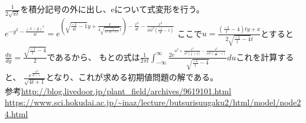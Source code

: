 \documentclass[11pt]{jsarticle}
\begin{document}
$\frac{1}{2\sqrt{\pi t}}$を積分記号の外に出し、eについて式変形を行う。$e^{-y^2 - \frac{(x-y)^2}{4t}} = e^{(\sqrt{\frac{-1}{4t} - 1}y + \frac{x}{4\sqrt{\frac{-1}{4(4t - 1)}}t}) - \frac{x^2}{4t} - \frac{x^2}{16t^2(\frac{-1}{4t} - 1)}}$
ここで$u = \frac{(\frac{-1}{t} - 4)ty + x}{2\sqrt{\frac{-1}{t} - 4}t}$とすると$\frac{du}{dy} = \frac{\sqrt{\frac{-1}{t} - 4}}{2}$であるから、
もとの式は$\frac{1}{2\pi t}\int_{-\infty}^{\infty}\frac{2e^{u^2 + \frac{x^2}{4t^2(\frac{1}{t} + 4)} - \frac{x^2}{16t^2(\frac{-1}{4t} - 1)}}}{\sqrt{\frac{-1}{t} - 4}}du$これを計算すると、
$\frac{e^{\frac{-x^2}{4t + 1}}}{\sqrt{4t + 1}}$となり、これが求める初期値問題の解である。\\
    参考\url{http://blog.livedoor.jp/plant_field/archives/9619101.html}\\
    \url{https://www.sci.hokudai.ac.jp/~inaz/lecture/butsurisuugaku2/html/model/node24.html}
\end{document}
